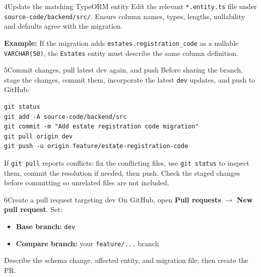 \documentclass[10pt,a4paper]{article}
\begin{document}
\begin{stepbox}{4}{Update the matching TypeORM entity}
Edit the relevant \texttt{*.entity.ts} file under \texttt{source-code/backend/src/}. Ensure column names, types, lengths, nullability and defaults agree with the migration.

\textbf{Example:} If the migration adds \texttt{estates.registration\_code} as a nullable \texttt{VARCHAR(50)}, the \texttt{Estates} entity must describe the same column definition.
\end{stepbox}

\begin{stepbox}{5}{Commit changes, pull latest dev again, and push}
Before sharing the branch, stage the changes, commit them, incorporate the latest \texttt{dev} updates, and push to GitHub:
\begin{lstlisting}[style=command]
git status
git add -A source-code/backend/src
git commit -m "Add estate registration code migration"
git pull origin dev
git push -u origin feature/estate-registration-code
\end{lstlisting}
If \texttt{git pull} reports conflicts: fix the conflicting files, use \texttt{git status} to inspect them, commit the resolution if needed, then push. Check the staged changes before committing so unrelated files are not included.
\end{stepbox}

\begin{stepbox}{6}{Create a pull request targeting dev}
On GitHub, open \textbf{Pull requests} \(\rightarrow\) \textbf{New pull request}. Set:
\begin{itemize}
  \item \textbf{Base branch:} \texttt{dev}
  \item \textbf{Compare branch:} your \texttt{feature/...} branch
\end{itemize}
Describe the schema change, affected entity, and migration file; then create the PR.
\end{stepbox}
\end{document}
